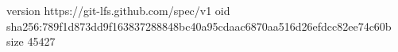 version https://git-lfs.github.com/spec/v1
oid sha256:789f1d873dd9f163837288848bc40a95cdaac6870aa516d26efdcc82ee74c60b
size 45427
